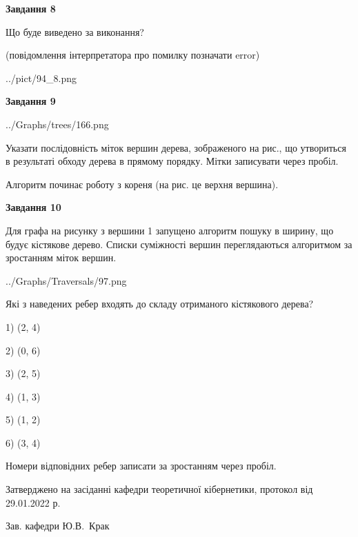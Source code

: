 \documentclass[12pt, ukrainian]{article}
\begin{document}
{\begin {large}
{\begin {center}\textbf{Завдання 8}\end {center}}\par
Що буде виведено за виконання?\par
 (повідомлення інтерпретатора про помилку позначати error)\par
\begin{center}
	{../pict/94_8.png}
\end{center}
\newpage

{\begin {center}\textbf{Завдання 9}\end {center}}\par

\begin{center}
	{../Graphs/trees/166.png}
\end{center}
Указати послідовність міток вершин дерева, зображеного на рис., що утвориться в результаті обходу дерева в прямому порядку. Мітки записувати через пробіл.\par Алгоритм починає роботу з кореня (на рис. це верхня вершина).\par
\newpage

{\begin {center}\textbf{Завдання 10}\end {center}}\par
Для графа на рисунку з вершини 1 запущено алгоритм пошуку в ширину, що будує кістякове дерево. Списки суміжності вершин переглядаються алгоритмом за зростанням міток вершин.\par
\begin{center}
	{../Graphs/Traversals/97.png}
\end{center}
\par Які з наведених ребер входять до складу отриманого кістякового дерева?\par
1) (2, 4)\par
2) (0, 6)\par
3) (2, 5)\par
4) (1, 3)\par
5) (1, 2)\par
6) (3, 4)\par
{\vskip 15pt} Номери відповідних ребер записати за зростанням через пробіл.\par
\newpage


\end {large}
}
{\smallskip \begin {small} Затверджено на засіданні кафедри теоретичної кібернетики, протокол  від   29.01.2022 р.\par\smallskip\smallskip
{\parbox {6.5 cm}{Зав. кафедри \dotfill Ю.В.~Крак}} \end{small}}
\end{document}
